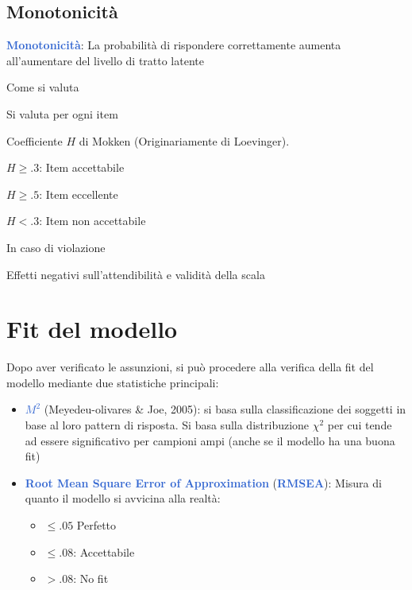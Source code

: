 \documentclass[
  ignorenonframetext,
]{beamer}
\providecommand{\tightlist}{%
  \setlength{\itemsep}{0pt}\setlength{\parskip}{0pt}}
\begin{document}
\hypertarget{monotonicituxe0}{%
\subsection{Monotonicità}\label{monotonicituxe0}}

\begin{frame}{}
\protect\hypertarget{section-2}{}
\textcolor{highlight}{\textbf{Monotonicità}}: La probabilità di
rispondere correttamente aumenta all'aumentare del livello di tratto
latente

\begin{block}{Come si valuta}

\vspace{3mm}
Si valuta per ogni item

Coefficiente $H$ di Mokken (Originariamente di Loevinger). 

$H \geq .3$: Item accettabile 

$H \geq .5$: Item eccellente 

$H < .3$: Item non accettabile 


\end{block}

\begin{block}{In caso di violazione}

\vspace{3mm}
Effetti negativi sull'attendibilità e validità della scala
\end{block}
\end{frame}

\hypertarget{fit-del-modello}{%
\section{Fit del modello}\label{fit-del-modello}}

\begin{frame}{}
\protect\hypertarget{section-3}{}
Dopo aver verificato le assunzioni, si può procedere alla verifica della
fit del modello mediante due statistiche principali:

\begin{itemize}
\item
  \textcolor{highlight}{\textbf{$M^2$}} (Meyedeu-olivares \& Joe, 2005):
  si basa sulla classificazione dei soggetti in base al loro pattern di
  risposta. Si basa sulla distribuzione \(\chi^2\) per cui tende ad
  essere significativo per campioni ampi (anche se il modello ha una
  buona fit)
\item
  \textcolor{highlight}{\textbf{Root Mean Square Error of Approximation}}
  (\textcolor{highlight}{\textbf{RMSEA}}): Misura di quanto il modello
  si avvicina alla realtà:

  \begin{itemize}
  \tightlist
  \item
    \(\leq .05\) Perfetto
  \item
    \(\leq .08\): Accettabile
  \item
    \(> .08\): No fit
  \end{itemize}
\end{itemize}
\end{frame}
\end{document}

